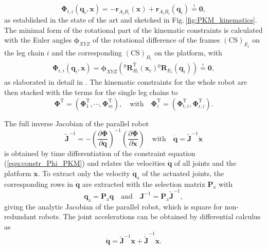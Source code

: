 \documentclass[fleqn,a4paper,10pt]{article}
\newcommand{\bm}[1]{\mathbf{#1}}
\renewcommand{\Phi}[1]{\varPhi{#1}}
\newcommand{\rotmat}[2]{{{ }^{#1}\bm{R}}_{#2}}
\newcommand{\transp}[0]{{\mathrm{T}}}
\newcommand{\ks}[1]{{(\mathrm{CS})}_{#1}}
\begin{document}
\begin{multicols}{2}
%
\begin{equation}
\bm{\Phi}_{\mathrm{t},i}(\bm{q}_i,\bm{x}) = - \bm{r}_{A_iB_i}(\bm{x}) + \bm{r}_{A_iB_i}(\bm{q}_i)
\overset{!}{=} \bm{0},
\label{equ:kinconstrAB}
\end{equation}
%
as established in the state of the art \cite{Merlet2006} and sketched in Fig.\,\ref{fig:PKM_kinematics}.
The minimal form of the rotational part of the kinematic constraints is calculated with the Euler angles $\bm{\phi}_{XYZ}$ of the rotational difference of the frames $\ks{E_i}$ on the leg chain $i$ and the corresponding $\ks{B_i}$ on the platform, with
%
\begin{align}
\bm{\Phi}_{\mathrm{r},i}(\bm{q}_i,\bm{x})
=
\bm{\phi}_{XYZ}\left(\rotmat{0}{B_i}^\transp (\bm{x}_{\mathrm{r}})\rotmat{0}{E_i}(\bm{q}_i)\right)
\overset{!}{=} \bm{0},
\label{equ:Phir_def_i}
\end{align}
%
as elaborated in detail in \cite{SchapplerTapOrt2019c}.
%
The kinematic constraints for the whole robot are then stacked with the terms for the single leg chains to 
%
\begin{equation}
\bm{\Phi}^\transp
=
(\bm{\Phi}_1^\transp,
\cdots,
\bm{\Phi}_m^\transp
),
\quad
\mathrm{with}
\quad
\bm{\Phi}_i^\transp=(
\bm{\Phi}_{\mathrm{t},i}^\transp, \bm{\Phi}_{\mathrm{r},i}^\transp
).
\label{equ:constr_Phi_PKM}
\end{equation}

The full inverse Jacobian of the parallel robot
%
\begin{equation}
\tilde{\bm{J}}^{-1}=-\left( \frac{\partial \bm{\Phi}}{\partial \bm{q}} \right)^{-1} \left( \frac{\partial \bm{\Phi}}{\partial \bm{x}} \right)
\quad \mathrm{with} \quad
\dot{\bm{q}}=\tilde{\bm{J}}^{-1} \dot{\bm{x}}%
\label{equ:jacobian}
\end{equation}
%
is obtained by time differentiation of the constraint equation (\ref{equ:constr_Phi_PKM})  and relates the velocities $\dot{\bm{q}}$ of all joints and the platform $\dot{\bm{x}}$.
To extract only the velocity $\dot{\bm{q}}_\mathrm{a}$ of the actuated joints, the corresponding rows in $\dot{\bm{q}}$ are extracted with the selection matrix $\bm{P}_{\mathrm{a}}$ with
%
\begin{equation}
\bm{q}_{\mathrm{a}} = \bm{P}_{\mathrm{a}} \bm{q}
\quad \mathrm{and} \quad
\bm{J}^{-1}=\bm{P}_{\mathrm{a}} \tilde{\bm{J}}^{-1},
\label{equ:jacobian_actuation}
\end{equation}
%
giving the analytic Jacobian of the parallel robot, which is square for non-redundant robots. %
The joint accelerations can be obtained by differential calculus as
%
\begin{equation}
\ddot{\bm{q}}=\tilde{\bm{J}}^{-1}\ddot{\bm{x}}+\dot{\tilde{\bm{J}}}^{-1}\dot{\bm{x}}.
\label{equ:acceleration_jacobian}
\end{equation}


\end{multicols}
\end{document}
